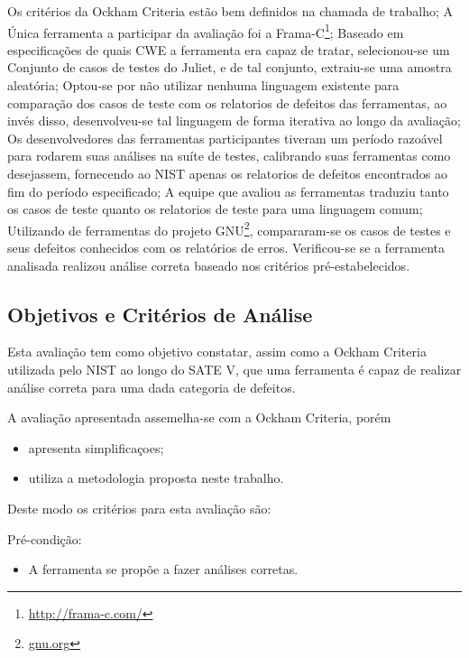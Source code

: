Os critérios da Ockham Criteria estão bem definidos na chamada de trabalho;
A Única ferramenta a participar da avaliação foi a Frama-C\footnote{\url{http://frama-c.com/}};
Baseado em especificações de quais CWE a ferramenta era capaz de tratar, selecionou-se um Conjunto de casos de testes do Juliet, e de tal conjunto, extraiu-se uma amostra aleatória;
Optou-se por não utilizar nenhuma linguagem existente para comparação dos casos de teste com os relatorios de defeitos das ferramentas, ao invés disso, desenvolveu-se tal linguagem de forma iterativa ao longo da avaliação;
Os desenvolvedores das ferramentas participantes tiveram um período razoável para rodarem suas análises na suíte de testes, calibrando suas ferramentas como desejassem, fornecendo ao NIST apenas os relatorios de defeitos encontrados ao fim do período especificado;
A equipe que avaliou as ferramentas traduziu tanto os casos de teste quanto os relatorios de teste para uma linguagem comum;
Utilizando de ferramentas do projeto GNU\footnote{\url{gnu.org}}, compararam-se os casos de testes e seus defeitos conhecidos com os relatórios de erros.
Verificou-se se a ferramenta analisada realizou análise correta baseado nos critérios pré-estabelecidos.

\subsection{Objetivos e Critérios de Análise}

Esta avaliação tem como objetivo constatar, assim como a Ockham Criteria utilizada pelo NIST ao longo do SATE V, que uma ferramenta é capaz de realizar análise correta para uma dada categoria de defeitos.

A avaliação apresentada assemelha-se com a Ockham Criteria, porém
\begin{itemize}
  \item apresenta simplificaçoes;
  \item utiliza a metodologia proposta neste trabalho.
\end{itemize}
Deste modo os critérios para esta avaliação são:

Pré-condição:
\begin{itemize}
  \item A ferramenta se propõe a fazer análises corretas.
\end{itemize}

